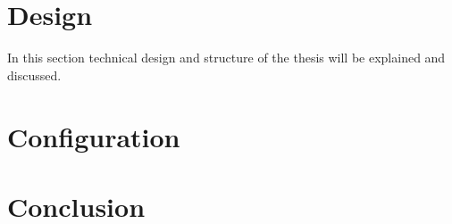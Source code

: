 \clearpage
\section{Design}
\label{des:proj}

In this section technical design and structure of the thesis will be explained and discussed. 

\section{Configuration}
\label{des:conf}

\section{Conclusion}
\label{des:conc}